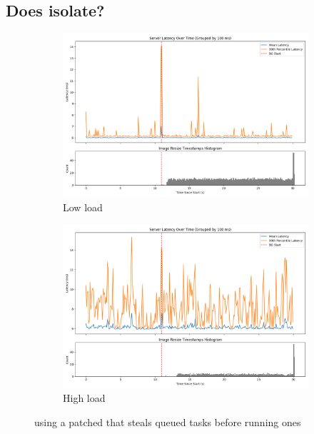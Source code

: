 \subsection{Does \schedbe{} isolate?}

\begin{figure}[t]
    \centering
    \begin{subfigure}[t]{0.49\columnwidth}
        \includegraphics[width=\columnwidth]{graphs/patched-idle-low-two.png}
        \caption{Low load}\label{fig:patched-idle-low-two}
    \end{subfigure}
    \hspace{\fill}
    \begin{subfigure}[t]{0.49\columnwidth}
        \includegraphics[width=\columnwidth]{graphs/patched-idle-high-two.png}
        \caption{High load}\label{fig:patched-idle-high-two}
    \end{subfigure}
    \vspace{4pt}
    \caption{using a patched \schedidle{} that steals queued \schednormal{}
    tasks before running \schedidle{} ones}\label{fig:patched-idle}
\end{figure}

